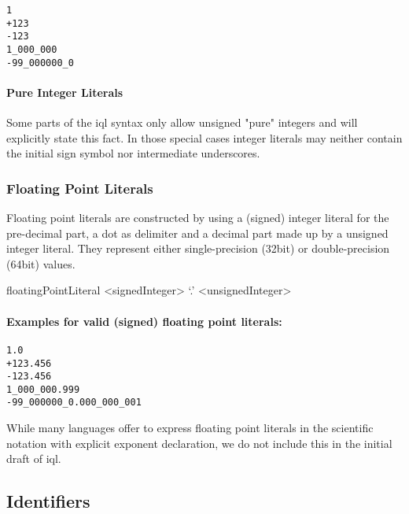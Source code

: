 \documentclass[11pt,a4paper]{article}
\begin{document}
\begin{Verbatim}[samepage=true]
1
+123
-123
1_000_000
-99_000000_0
\end{Verbatim}

\paragraph{Pure Integer Literals}
Some parts of the \ac{iql} syntax only allow unsigned "pure" integers and will explicitly state this fact. In those special cases integer literals may neither contain the initial sign symbol nor intermediate underscores.

\subsubsection{Floating Point Literals}
\label{sec:floating-point-literals}

Floating point literals are constructed by using a (signed) integer literal for the pre-decimal part, a dot  as delimiter and a decimal part made up by a unsigned integer literal. They represent either single-precision  (32bit) or double-precision  (64bit) values.

\begin{gram}
	\label{gram:floating-point}
	\begin{rrdiag*}{floatingPointLiteral}
		<signedInteger> `.' <unsignedInteger>
	\end{rrdiag*}
\end{gram}

\paragraph{Examples for valid (signed) floating point literals:}

\begin{Verbatim}[samepage=true]
1.0
+123.456
-123.456
1_000_000.999
-99_000000_0.000_000_001
\end{Verbatim}

\noindent While many languages offer to express floating point literals in the scientific notation with explicit exponent declaration, we do not include this in the initial draft of \ac{iql}.

\subsection{Identifiers}
\label{sec:identifiers}
\end{document}
